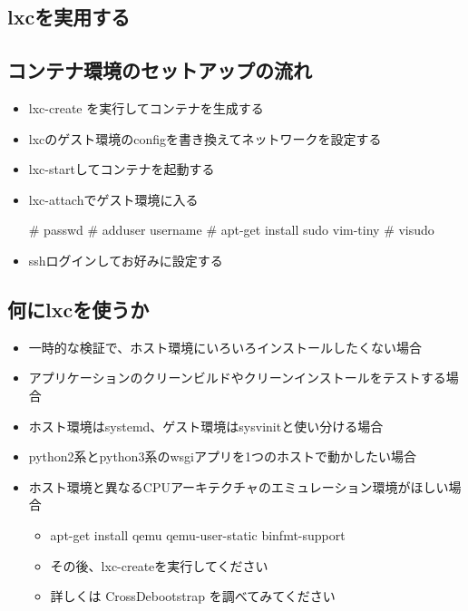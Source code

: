 \documentclass[mingoth,a4paper]{jsarticle}
\begin{document}
\subsection{lxcを実用する}

\subsection[containsverbatim]{コンテナ環境のセットアップの流れ}
  \begin{itemize}
  \item lxc-create を実行してコンテナを生成する
  \item lxcのゲスト環境のconfigを書き換えてネットワークを設定する
  \item lxc-startしてコンテナを起動する
  \item lxc-attachでゲスト環境に入る
  \begin{commandline}
  # passwd
  # adduser username
  # apt-get install sudo vim-tiny
  # visudo
  \end{commandline}
  \item sshログインしてお好みに設定する
  \end{itemize}


\subsection[containsverbatim]{何にlxcを使うか}
  \begin{itemize}
  \item 一時的な検証で、ホスト環境にいろいろインストールしたくない場合
  \item アプリケーションのクリーンビルドやクリーンインストールをテストする場合
  \item ホスト環境はsystemd、ゲスト環境はsysvinitと使い分ける場合
  \item python2系とpython3系のwsgiアプリを1つのホストで動かしたい場合
  \item ホスト環境と異なるCPUアーキテクチャのエミュレーション環境がほしい場合
    \begin{itemize}
    \item apt-get install qemu qemu-user-static binfmt-support
    \item その後、lxc-createを実行してください
    \item 詳しくは CrossDebootstrap を調べてみてください
    \end{itemize}
  \end{itemize}
\end{document}
